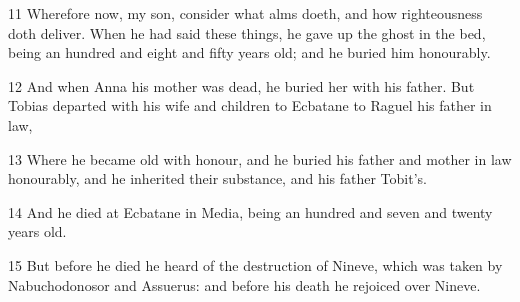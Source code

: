 \par 11 Wherefore now, my son, consider what alms doeth, and how righteousness doth deliver. When he had said these things, he gave up the ghost in the bed, being an hundred and eight and fifty years old; and he buried him honourably.
\par 12 And when Anna his mother was dead, he buried her with his father. But Tobias departed with his wife and children to Ecbatane to Raguel his father in law,
\par 13 Where he became old with honour, and he buried his father and mother in law honourably, and he inherited their substance, and his father Tobit's.
\par 14 And he died at Ecbatane in Media, being an hundred and seven and twenty years old.
\par 15 But before he died he heard of the destruction of Nineve, which was taken by Nabuchodonosor and Assuerus: and before his death he rejoiced over Nineve.

